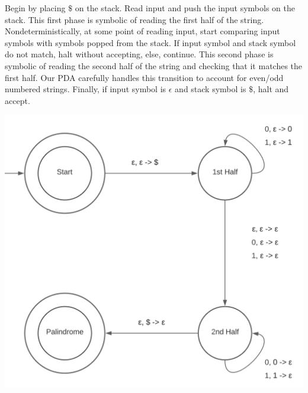 \documentclass{article}
\begin{document}

Begin by placing $\$$ on the stack. Read input and push the input symbols on the stack. This first phase is symbolic of reading the first half of the string. Nondeterministically, at some point of reading input, start comparing input symbols with symbols popped from the stack. If input symbol and stack symbol do not match, halt without accepting, else, continue. This second phase is symbolic of reading the second half of the string and checking that it matches the first half. Our PDA carefully handles this transition to account for even/odd numbered strings. Finally, if input symbol is $\epsilon$ and stack symbol is $\$$, halt and accept. 

\includegraphics[scale=.65]{2.5.b.png}
\end{document}
